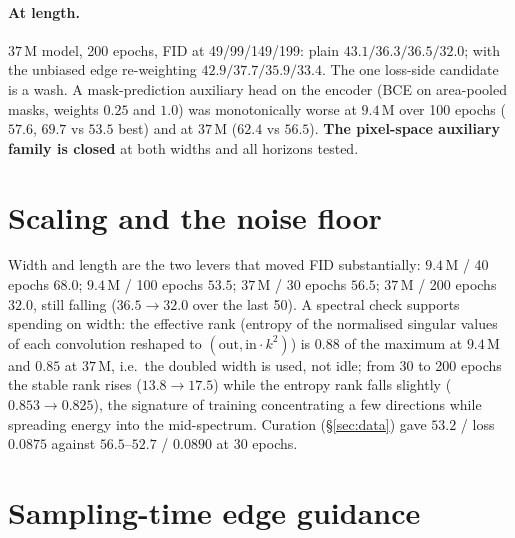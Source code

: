 \documentclass[11pt]{article}
\begin{document}
\paragraph{At length.} $37$\,M model, 200 epochs, FID at 49/99/149/199: plain
$43.1/36.3/36.5/32.0$; with the unbiased edge re-weighting $42.9/37.7/35.9/33.4$. The one
loss-side candidate is a wash. A mask-prediction auxiliary head on the encoder (BCE on
area-pooled masks, weights $0.25$ and $1.0$) was monotonically worse at $9.4$\,M over 100
epochs ($57.6$, $69.7$ vs $53.5$ best) and at $37$\,M ($62.4$ vs $56.5$). \textbf{The
pixel-space auxiliary family is closed} at both widths and all horizons tested.

\section{Scaling and the noise floor}\label{sec:scaling}

Width and length are the two levers that moved FID substantially: $9.4$\,M / 40 epochs
$68.0$; $9.4$\,M / 100 epochs $53.5$; $37$\,M / 30 epochs $56.5$; $37$\,M / 200 epochs
$32.0$, still falling ($36.5\to32.0$ over the last 50). A spectral check supports
spending on width: the effective rank (entropy of the normalised singular values of each
convolution reshaped to $(\text{out},\text{in}\cdot k^2)$) is $0.88$ of the maximum at
$9.4$\,M and $0.85$ at $37$\,M, i.e.\ the doubled width is used, not idle; from 30 to
200 epochs the stable rank rises ($13.8\to17.5$) while the entropy rank falls slightly
($0.853\to0.825$), the signature of training concentrating a few directions while
spreading energy into the mid-spectrum. Curation (\S\ref{sec:data}) gave $53.2$ / loss
$0.0875$ against $56.5$--$52.7$ / $0.0890$ at 30 epochs.

\section{Sampling-time edge guidance}\label{sec:guidance}
\end{document}

